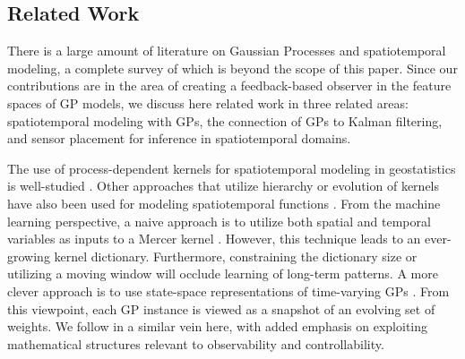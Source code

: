 \subsection{Related Work}\label{sec:related}
There is a large amount of literature on Gaussian Processes and spatiotemporal modeling, a complete survey of which is beyond the scope of this paper. Since our contributions are in the area of creating a feedback-based observer in the feature spaces of GP models, we discuss here related work in three related areas: spatiotemporal modeling with GPs, the connection of GPs to Kalman filtering, and sensor placement for inference in spatiotemporal domains.
 
The use of process-dependent kernels for spatiotemporal modeling in geostatistics is well-studied \cite{wikle2002kernel,cressie2011statistics,stroud2001dynamic}. Other approaches that utilize hierarchy or evolution of kernels have also been used for modeling spatiotemporal functions \cite{hartikainen2013sequential,lindgren2011explicit,ho1996multiresolution}. 
From the machine learning perspective, a naive approach is to utilize both spatial and temporal variables as inputs to a Mercer kernel \cite{perez2013gaussian}. However, this technique leads to an ever-growing kernel dictionary. %
Furthermore, constraining the dictionary size or utilizing a moving window will
occlude learning of long-term patterns. 
A more clever approach is to use state-space representations of time-varying GPs \cite{sarkka2014convergence,hartikainen2013sequential}. From this viewpoint, each GP instance is viewed as a snapshot of an evolving set of weights. We follow in a similar vein here, with added emphasis on exploiting mathematical structures relevant to observability and controllability.
